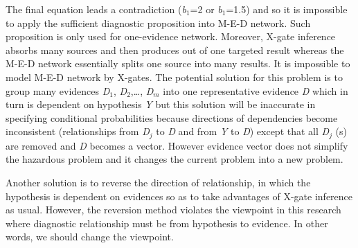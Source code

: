 \documentclass{article}
\numberwithin{equation}{section}
\numberwithin{figure}{section}
\numberwithin{table}{section}
\begin{document}
The final equation leads a contradiction (\textit{b}${}_{1}$=2 or \textit{b}${}_{1}$=1.5) and so it is impossible to apply the sufficient diagnostic proposition into M-E-D network. Such proposition is only used for one-evidence network. Moreover, X-gate inference absorbs many sources and then produces out of one targeted result whereas the M-E-D network essentially splits one source into many results. It is impossible to model M-E-D network by X-gates. The potential solution for this problem is to group many evidences \textit{D}${}_{1}$, \textit{D}${}_{2}$,{\dots}, \textit{D${}_{m}$} into one representative evidence \textit{D} which in turn is dependent on hypothesis \textit{Y} but this solution will be inaccurate in specifying conditional probabilities because directions of dependencies become inconsistent (relationships from \textit{D${}_{j}$} to \textit{D} and from \textit{Y} to \textit{D}) except that all \textit{D${}_{j}$} (s) are removed and \textit{D} becomes a vector. However evidence vector does not simplify the hazardous problem and it changes the current problem into a new problem.

Another solution is to reverse the direction of relationship, in which the hypothesis is dependent on evidences so as to take advantages of X-gate inference as usual. However, the reversion method violates the viewpoint in this research where diagnostic relationship must be from hypothesis to evidence. In other words, we should change the viewpoint.
\end{document}
